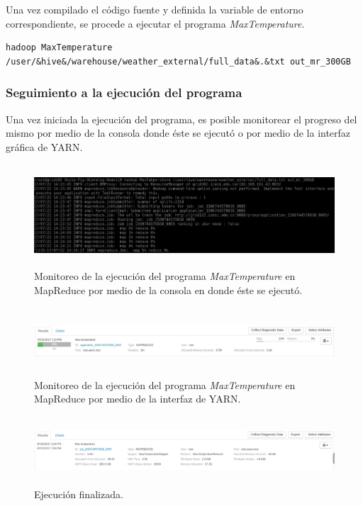 Una vez compilado el código fuente y definida la variable de entorno correspondiente, se procede a ejecutar el programa \textit{MaxTemperature}.

\begin{lstlisting}[linewidth=\columnwidth,breaklines=true]
hadoop MaxTemperature /user/&hive&/warehouse/weather_external/full_data&.&txt out_mr_300GB
\end{lstlisting}


\subsubsection{Seguimiento a la ejecución del programa}

Una vez iniciada la ejecución del programa, es posible monitorear el progreso del mismo por medio de la consola donde éste se ejecutó o por medio de la interfaz gráfica de YARN.

\begin{figure}[H]
  \centering
      \includegraphics[width=\textwidth, height=1.5in]{fig/04/00}
  \caption{Monitoreo de la ejecución del programa \textit{MaxTemperature} en MapReduce por medio de la consola en donde éste se ejecutó.}
\end{figure}

\begin{figure}[H]
  \centering
      \includegraphics[width=\textwidth, height=1.0in]{fig/04/01}
  \caption{Monitoreo de la ejecución del programa \textit{MaxTemperature} en MapReduce por medio de la interfaz de YARN.}
\end{figure}

\begin{figure}[H]
  \centering
      \includegraphics[width=\textwidth, height=1.0in]{fig/04/02}
  \caption{Ejecución finalizada.}
\end{figure}

